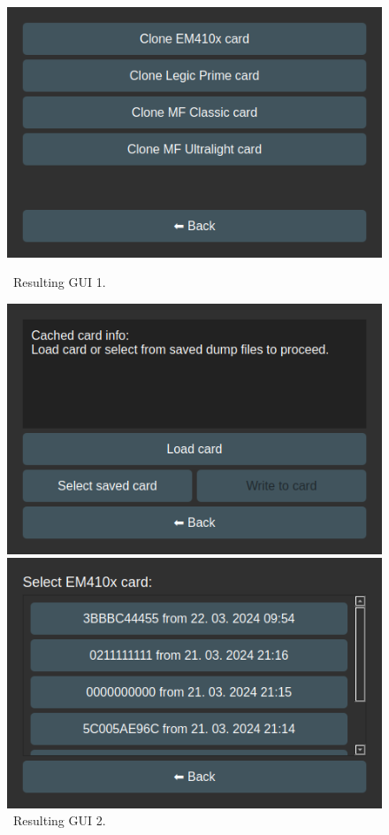 \begin{figure}[h]
    \centering
    \begin{minipage}[b]{0.315\textwidth}
        \centering
        \includegraphics[width=\textwidth]{text/ui1.png}
        \caption{~Resulting GUI 1.}
        \label{fig:ui1}
    \end{minipage}
    \hfill
    \begin{minipage}[b]{0.315\textwidth}
        \centering
        \includegraphics[width=\textwidth]{text/ui2.png}
        \caption{~Resulting GUI 2.}
        \label{fig:ui2}
    \end{minipage}
    \hfill
    \begin{minipage}[b]{0.315\textwidth}
        \centering
        \includegraphics[width=\textwidth]{text/ui3.png}

\end{minipage}
\end{figure}

